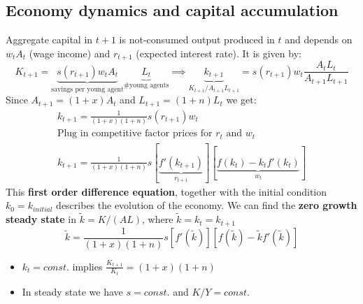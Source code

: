 \subsection{Economy dynamics and capital accumulation}
Aggregate capital in $t+1$ is not-consumed output produced in $t$ and depends on $w_tA_t$ (wage income) and $r_{t+1}$ (expected interest rate). It is given by: 
$$ K_{t+1} = \underbrace{s(r_{t+1})w_t A_t}_{\text{savings per young agent}} \underbrace{L_t}_{\text{\# young agents}} \implies \underbrace{k_{t+1}}_{K_{t+1} / A_{t+1}L_{t+1}} = s(r_{t+1})w_t \frac{A_t L_t}{A_{t+1} L_{t+1}} $$
Since $A_{t+1}=(1+x)A_t$ and $L_{t+1}=(1+n)L_t$ we get: 
\begin{gather*}
k_{t+1} = \frac{1}{(1+x)(1+n)} s(r_{t+1}) w_t \\[2ex]
\text{Plug in competitive factor prices for $r_t$ and $w_t$}
\\
k_{t+1} = \frac{1}{(1+x)(1+n)} s \left[ \underbrace{f'(k_{t+1})}_{r_{t+1}} \right] \left[ \underbrace{f(k_t) - k_t f'(k_t)}_{w_t} \right]
\end{gather*}
This \textbf{first order difference equation}, together with the initial condition $k_0=k_{initial}$ describes the evolution of the economy. We can find the \textbf{zero growth steady state} in $\tilde{k}=K/(AL)$, where $\tilde{k}=k_t=k_{t+1}$
$$\tilde{k} = \frac{1}{(1+x)(1+n)} s \left[ f'(\tilde{k}) \right] \left[ f(\tilde{k}) - \tilde{k} f'(\tilde{k}) \right]$$
\begin{itemize}
    \item $k_t=const.$ implies $\frac{K_{t+1}}{K_t}=(1+x)(1+n)$
    \item In steady state we have $s=const.$ and $K/Y=const.$
\end{itemize}\\

